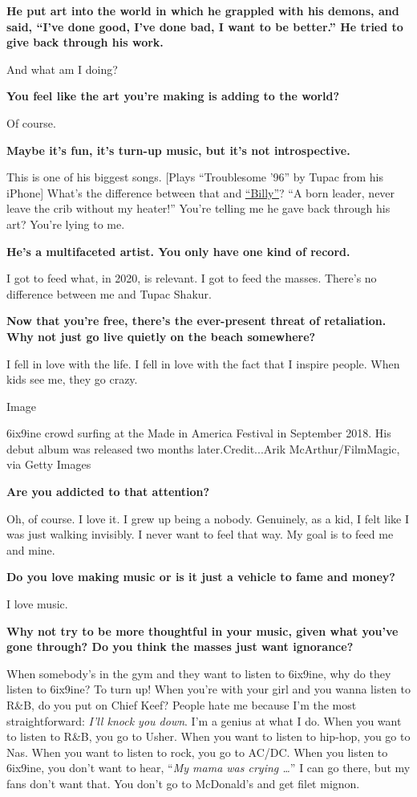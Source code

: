 \textbf{He put art into the world in which he grappled with his demons,
and said, ``I've done good, I've done bad, I want to be better.'' He
tried to give back through his work.}

And what am I doing?

\textbf{You feel like the art you're making is adding to the world?}

Of course.

\textbf{Maybe it's fun, it's turn-up music, but it's not introspective.}

This is one of his biggest songs. {[}Plays ``Troublesome '96'' by Tupac
from his iPhone{]} What's the difference between that and
\href{https://www.youtube.com/watch?v=LJjsm6CVsG8}{``Billy''}? ``A born
leader, never leave the crib without my heater!'' You're telling me he
gave back through his art? You're lying to me.

\textbf{He's a multifaceted artist. You only have one kind of record.}

I got to feed what, in 2020, is relevant. I got to feed the masses.
There's no difference between me and Tupac Shakur.

\textbf{Now that you're free, there's the ever-present threat of
retaliation. Why not just go live quietly on the beach somewhere?}

I fell in love with the life. I fell in love with the fact that I
inspire people. When kids see me, they go crazy.

Image

6ix9ine crowd surfing at the Made in America Festival in September 2018.
His debut album was released two months later.Credit...Arik
McArthur/FilmMagic, via Getty Images

\textbf{Are you addicted to that attention?}

Oh, of course. I love it. I grew up being a nobody. Genuinely, as a kid,
I felt like I was just walking invisibly. I never want to feel that way.
My goal is to feed me and mine.

\textbf{Do you love making music or is it just a vehicle to fame and
money?}

I love music.

\textbf{Why not try to be more thoughtful in your music, given what
you've gone through? Do you think the masses just want ignorance?}

When somebody's in the gym and they want to listen to 6ix9ine, why do
they listen to 6ix9ine? To turn up! When you're with your girl and you
wanna listen to R\&B, do you put on Chief Keef? People hate me because
I'm the most straightforward: \emph{I'll knock you down}. I'm a genius
at what I do. When you want to listen to R\&B, you go to Usher. When you
want to listen to hip-hop, you go to Nas. When you want to listen to
rock, you go to AC/DC. When you listen to 6ix9ine, you don't want to
hear, ``\emph{My mama was crying \ldots{}}'' I can go there, but my fans
don't want that. You don't go to McDonald's and get filet mignon.


